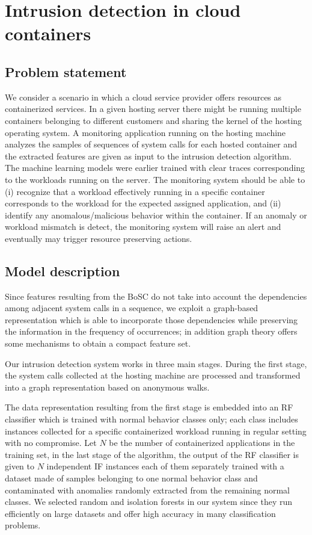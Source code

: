 \section{Intrusion detection in cloud containers}\label{sec:model}
\subsection{Problem statement}
We consider a scenario in which a cloud service provider offers resources as containerized services. In a given hosting server there might be running multiple containers belonging to different customers and sharing the kernel of the hosting operating system. A monitoring application running on the hosting machine analyzes the samples of sequences of system calls for each hosted container and the extracted features are given as input to the intrusion detection algorithm. The machine learning models were earlier trained with clear traces corresponding to the workloads running on the server. The monitoring system should be able to (i) recognize that a workload effectively running in a specific container corresponds to the workload for the expected assigned application, and (ii) identify any anomalous/malicious behavior within the container. If an anomaly or workload mismatch is detect, the monitoring system will raise an alert and eventually may trigger resource preserving actions.

\subsection{Model description}

Since features resulting from the BoSC do not take into account the dependencies among adjacent system calls in a sequence, we  exploit a graph-based representation which is able to incorporate those dependencies while preserving the information in the frequency of occurrences; in addition graph theory offers some mechanisms to obtain a compact feature set.

Our intrusion detection system works in three main stages. During the first stage, the system calls collected at the hosting machine are processed and transformed into a graph representation based on anonymous walks.

The data representation resulting from the first stage is embedded into an RF classifier which is trained with normal behavior classes only; each class includes instances collected for a specific containerized workload running in regular setting with no compromise. Let $N$ be the number of containerized applications in the training set, in the last stage of the algorithm, the output of the RF classifier is given to $N$ independent IF instances each of them separately trained with a dataset made of samples belonging to one normal behavior class and contaminated with anomalies randomly extracted from the remaining normal classes. We selected random and isolation forests in our system since they run efficiently on large datasets and offer high accuracy in many classification problems.

